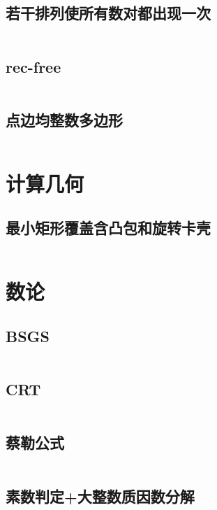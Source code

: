 \documentclass{article}
\begin{document}
\subsection{若干排列使所有数对都出现一次}
\inputminted[breaklines]{c++}{../构造/若干排列使所有数对都出现一次.cpp}

\subsection{rec-free}
\inputminted[breaklines]{c++}{../构造/rec-free.cpp}

\subsection{点边均整数多边形}
\inputminted[breaklines]{c++}{../构造/点边均整数多边形.cpp}

\newpage
\section{计算几何}
\subsection{最小矩形覆盖含凸包和旋转卡壳}
\inputminted[breaklines]{c++}{../计算几何/最小矩形覆盖含凸包和旋转卡壳.cpp}

\newpage
\section{数论}
\subsection{BSGS}
\inputminted[breaklines]{c++}{../数论/BSGS.cpp}

\subsection{CRT}
\inputminted[breaklines]{c++}{../数论/CRT.cpp}

\subsection{蔡勒公式}
\inputminted[breaklines]{c++}{../数论/蔡勒公式.cpp}

\subsection{素数判定+大整数质因数分解}
\inputminted[breaklines]{c++}{../数论/素数判定+大整数质因数分解.cpp}
\end{document}
